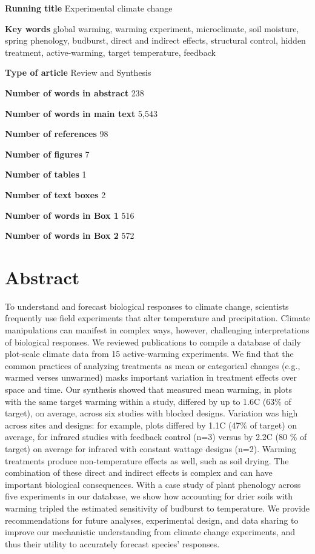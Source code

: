 \documentclass{article}
\begin{document}
\textbf{Running title} Experimental climate change

\textbf{Key words} global warming, warming experiment, microclimate, soil moisture, spring phenology, budburst, direct and indirect effects, structural control, hidden treatment, active-warming, target temperature, feedback

\textbf{Type of article} Review and Synthesis

\textbf{Number of words in abstract} 238

\textbf{Number of words in main text} 5,543%

\textbf{Number of references} 98

\textbf{Number of figures} 7

\textbf{Number of tables} 1

\textbf{Number of text boxes} 2

\textbf{Number of words in Box 1} 516

\textbf{Number of words in Box 2} 572

\clearpage

\clearpage
\linenumbers


 
\section*{Abstract}
\par To understand and forecast biological responses to climate change, scientists frequently use field experiments that alter temperature and precipitation. Climate manipulations can manifest in complex ways, however, challenging interpretations of biological responses. We reviewed publications to compile a database of daily plot-scale climate data from 15 active-warming experiments. We find that the common practices of analyzing treatments as mean or categorical changes (e.g., warmed verses unwarmed) masks important variation in treatment effects over space and time. Our synthesis showed that measured mean warming, in plots with the same target warming within a study, differed by up to 1.6\degree C (63\% of target), on average, across six studies with blocked designs. Variation was high across sites and designs: for example, plots differed by 1.1\degree C (47\% of target) on average, for infrared studies with feedback control (n=3) versus by 2.2\degree C (80 \% of target) on average for infrared with constant wattage designs (n=2). Warming treatments produce non-temperature effects as well, such as soil drying. The combination of these direct and indirect effects is complex and can have important biological consequences. With a case study of plant phenology across five experiments in our database, we show how accounting for drier soils with warming tripled the estimated sensitivity of budburst to temperature. We provide recommendations for future analyses, experimental design, and data sharing to improve our mechanistic understanding from climate change experiments, and thus their utility to accurately forecast species' responses.
\end{document}
